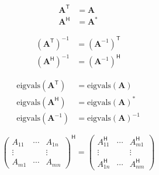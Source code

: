 \noindent\begin{align*}
    {\mathbf{A}}^\mathsf{T} & = \mathbf{A}   \\
    {\mathbf{A}}^\mathsf{H} & = \mathbf{A}^*
\end{align*}

\noindent\begin{align*}
    {(\mathbf{A}^\mathsf{T})}^{-1} & = {(\mathbf{A}^{-1})}^\mathsf{T} \\
    {(\mathbf{A}^\mathsf{H})}^{-1} & = {(\mathbf{A}^{-1})}^\mathsf{H}
\end{align*}

\noindent\begin{align*}
    \mathrm{eigvals}(\mathbf{A}^\mathsf{T}) & = \mathrm{eigvals}(\mathbf{A})        \\
    \mathrm{eigvals}(\mathbf{A}^\mathsf{H}) & = \mathrm{eigvals}{(\mathbf{A})}^*    \\
    \mathrm{eigvals}(\mathbf{A}^{-1})       & = \mathrm{eigvals}{(\mathbf{A})}^{-1}
\end{align*}

\noindent\begin{equation*}
    \begin{pmatrix}
        A_{11} & \cdots & A_{1n} \\
        \vdots &        & \vdots \\
        A_{m1} & \cdots & A_{mn}
    \end{pmatrix}^\mathsf{H}=
    \begin{pmatrix}
        A_{11}^\mathsf{H} & \cdots & A_{m1}^\mathsf{H} \\
        \vdots            &        & \vdots            \\
        A_{1n}^\mathsf{H} & \cdots & A_{nm}^\mathsf{H}
    \end{pmatrix}
\end{equation*}